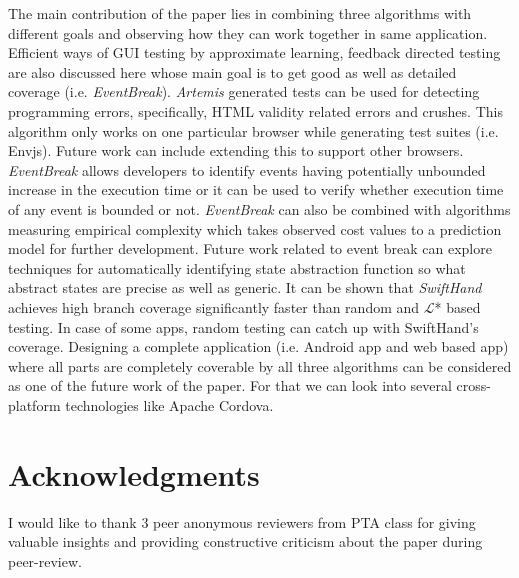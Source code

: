 \documentclass[authoryear,preprint, twocolumn]{sigplanconf}
\begin{document}
The main contribution of the paper lies in combining three algorithms with different goals and observing how they can work together in same application. Efficient ways of GUI testing by approximate learning, feedback directed testing are also discussed here whose main goal is to get good as well as detailed coverage (i.e. \emph{EventBreak}).
\newline \emph{Artemis} generated tests can  be used for detecting programming errors, specifically, HTML validity related errors and crushes. This algorithm only works on one particular browser while generating test suites (i.e. Envjs). Future work can include extending this to support other browsers.
\newline \emph{EventBreak} allows developers to identify events having potentially unbounded increase in the execution time or it can be used to verify whether execution time of any event is bounded or not. \emph{EventBreak} can also be combined with algorithms measuring empirical complexity which takes observed cost values to a prediction model for further development. Future work related to event break can explore techniques for automatically identifying state abstraction function so what abstract states are precise as well as generic.
\newline It can be shown that \emph{SwiftHand} achieves high branch coverage significantly faster than random and $\mathcal{L}$* based testing. In case of some apps, random testing can catch up with SwiftHand's coverage. 
\newline Designing a complete application (i.e. Android app and web based app) where all parts are completely coverable by all three algorithms can be considered as one of the future work of the paper. For that we can look into several cross-platform technologies like Apache Cordova.
 
\section{Acknowledgments}
\label{sec:ack}

I would like to thank 3 peer anonymous reviewers from PTA class for giving valuable insights and providing constructive criticism about the paper during peer-review.

%

\nocite{*}
%


%
\end{document}
